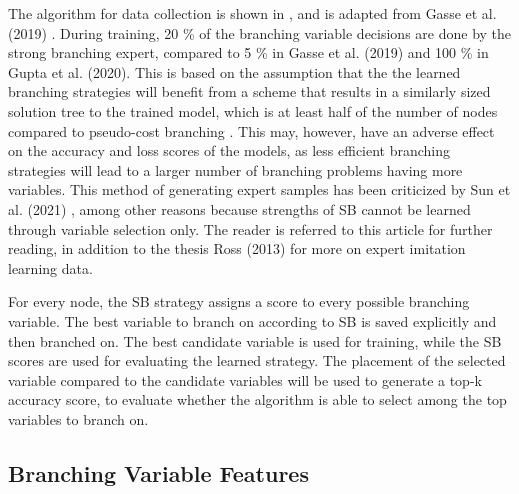 The algorithm for data collection is shown in , and is adapted from Gasse et al. (2019) \cite{gasse2019exact}. During training, 20 \% of the branching variable decisions are done by the strong branching expert, compared to 5 \% in Gasse et al. (2019) \cite{gasse2019exact} and 100 \% in Gupta et al. (2020). This is based on the assumption that the the learned branching strategies will benefit from a scheme that results in a similarly sized solution tree to the trained model, which is at least half of the number of nodes compared to pseudo-cost branching \cite{gasse2019exact}. This may, however, have an adverse effect on the accuracy and loss scores of the models, as less efficient branching strategies will lead to a larger number of branching problems having more variables. This method of generating expert samples has been criticized by Sun et al. (2021) \cite{sun2021improving}, among other reasons because strengths of \gls{SB} cannot be learned through variable selection only. The reader is referred to this article for further reading, in addition to the thesis Ross (2013) \cite{ross2013interactive} for more on expert imitation learning data. 



For every node, the \gls{SB} strategy assigns a score to every possible branching variable. The best variable to branch on according to \gls{SB} is saved explicitly and then branched on. The best candidate variable is used for training, while the \gls{SB} scores are used for evaluating the learned strategy. The placement of the selected variable compared to the candidate variables will be used to generate a top-k accuracy score, to evaluate whether the algorithm is able to select among the top variables to branch on.  


\subsection{Branching Variable Features}


